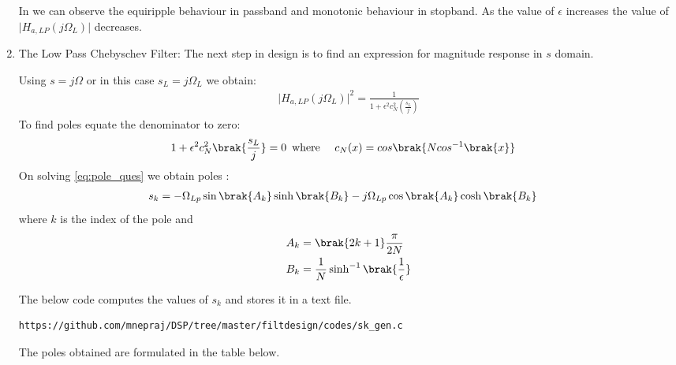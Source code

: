 \documentclass{article}
\begin{document}
\begin{enumerate}
          In  we can observe the equiripple behaviour in passband and monotonic behaviour in stopband. As the value of $\epsilon$ increases the value of $\vert H_{a,LP}(j\Omega_L)\vert$ decreases.\\
          
    \item {The Low Pass Chebyschev Filter:} The next step in design is to find an expression for magnitude response in $s$ domain.
          
          Using $s=j\Omega$ or in this case $s_{L}=j\Omega_{L}$ we obtain:
          \begin{align}
              \vert H_{a,LP}(j\Omega_L)\vert^2 = \frac{1}{1 + \epsilon^2c_N^2(\frac{s_L}{j})}
          \end{align}
          To find poles equate the denominator to zero:
          \begin{align}
              {1 + \epsilon^2c_N^2\brak{\frac{s_L}{j}}} & =0\hspace{5pt }
              \text{where } \hspace{10pt} c_N(x) = cos\brak{Ncos^{-1}\brak{x}} \label{eq:pole_ques}
          \end{align}
          On solving \eqref{eq:pole_ques} we obtain poles :
          \begin{align}
              s_{k} & = -\Omega_{Lp} \sin\brak{A_k}\sinh\brak{B_k} - j\Omega_{Lp}\cos\brak{A_k}\cosh\brak{B_k}
          \end{align}
          where $k$ is the index of the pole and \\
          \begin{align}
              A_k & = \brak{2k+1}\frac{\pi}{2N}                       \\
              B_k & = \frac{1}{N} \sinh^{-1}\brak{\frac{1}{\epsilon}}
          \end{align}
          
          The below code computes the values of $s_k$ and stores it in a text file. 
          \begin{lstlisting}
https://github.com/mnepraj/DSP/tree/master/filtdesign/codes/sk_gen.c
\end{lstlisting}
          The poles obtained are formulated in the table below.
          
          

\end{enumerate}
\end{document}
